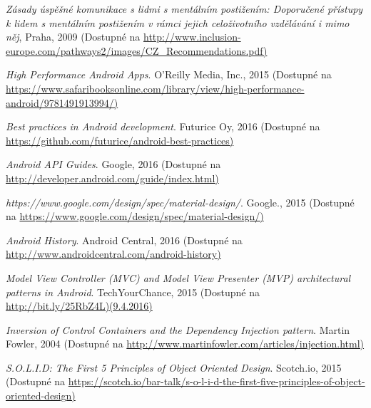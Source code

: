 \documentclass[czech,master,public,dept460,male,java,cpdeclaration]{diploma}
\begin{document}
\begin{thebibliography}{99}


\textit{Zásady úspěšné komunikace s lidmi s mentálním postižením: Doporučené přístupy k lidem
s mentálním postižením v rámci jejich celoživotního vzdělávání i mimo něj}, {Praha, 2009}
\newline(Dostupné na \url{http://www.inclusion-europe.com/pathways2/images/CZ_Recommendations.pdf)}

\textit{High Performance Android Apps}. {O'Reilly Media, Inc., 2015}
\newline(Dostupné na \url{https://www.safaribooksonline.com/library/view/high-performance-android/9781491913994/)}

\textit{Best practices in Android development}. {Futurice Oy, 2016}
\newline(Dostupné na \url{https://github.com/futurice/android-best-practices)}


\textit{Android API Guides}. {Google, 2016}
\newline(Dostupné na \url{http://developer.android.com/guide/index.html)}

\textit{https://www.google.com/design/spec/material-design/}. {Google., 2015}
\newline(Dostupné na \url{https://www.google.com/design/spec/material-design/)}

\textit{Android History}. {Android Central, 2016}
\newline(Dostupné na \url{http://www.androidcentral.com/android-history)}

\textit{Model View Controller (MVC) and Model View Presenter (MVP) architectural patterns in Android}. {TechYourChance, 2015}
\newline(Dostupné na \url{http://bit.ly/25RbZ4L)(9.4.2016)}



\textit{Inversion of Control Containers and the Dependency Injection pattern}. {Martin Fowler, 2004}
\newline(Dostupné na \url{http://www.martinfowler.com/articles/injection.html)}


\textit{S.O.L.I.D: The First 5 Principles of Object Oriented Design}. {Scotch.io, 2015}
\newline(Dostupné na \url{https://scotch.io/bar-talk/s-o-l-i-d-the-first-five-principles-of-object-oriented-design)}


\end{thebibliography}
\end{document}
